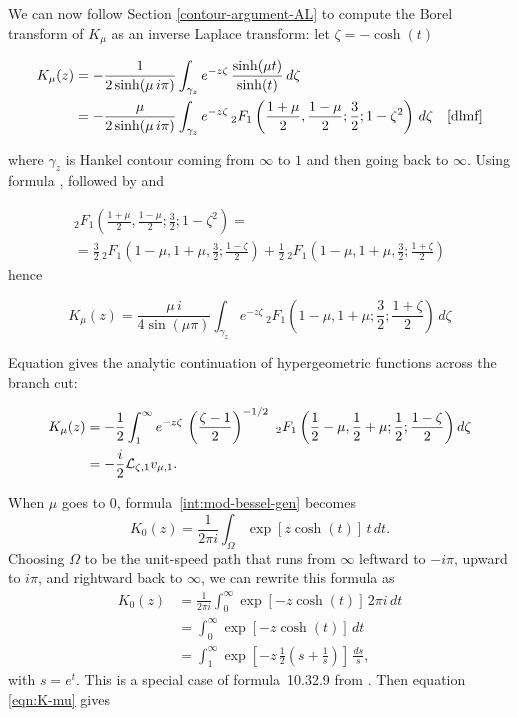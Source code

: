\documentclass{article}
\theoremstyle{definition}
\newcommand{\laplace}{\mathcal{L}}
\begin{document}
We can now follow Section \ref{contour-argument-AL} to compute the Borel transform of $K_\mu$ as an inverse Laplace transform: let $\zeta=-\cosh(t)$

\begin{align*}
    K_\mu(z)& = -\frac{1}{2 \sinh(\mu\,i\pi)} \int_{\gamma_z} e^{-z \zeta}\,\frac{\sinh(\mu t)}{\sinh(t)}\,d\zeta  & \\
    &=-\frac{\mu}{2 \sinh(\mu\,i\pi)} \int_{\gamma_z} e^{-z \zeta}\, {}_2F_1\left(\frac{1+\mu}{2},\frac{1-\mu}{2};\frac{3}{2};1-\zeta^2\right)\,d\zeta & \cite[15.4.16]{dlmf}
\end{align*}

where $\gamma_z$ is Hankel contour coming from $\infty$ to $1$ and then going back to $\infty$. Using formula \cite[15.8.4]{dlmf}, followed by \cite[15.8.27]{dlmf} and \cite[15.8.28]{dlmf}

\begin{multline*}
     {}_2F_1\left(\frac{1+\mu}{2},\frac{1-\mu}{2};\frac{3}{2};1-\zeta^2\right) = \\
     =\frac{3}{2}\, {}_2F_1\left(1-\mu,1+\mu,\frac{3}{2};\frac{1-\zeta}{2}\right)+\frac{1}{2}\, {}_2F_1\left(1-\mu,1+\mu,\frac{3}{2};\frac{1+\zeta}{2}\right)
\end{multline*}
hence 

\[K_\mu(z)=\frac{\mu\, i}{4 \sin(\mu\pi)} \int_{\gamma_z} e^{-z \zeta}\, {}_2F_1\left(1-\mu,1+\mu;\frac{3}{2};\frac{1+\zeta}{2}\right)\,d\zeta\]

Equation \cite[15.2.3]{dlmf} gives the analytic continuation of hypergeometric functions across the branch cut:

\begin{align}
    K_{\mu}(z)& \label{eqn:K-mu}=-\frac{1}{2}\int_1^\infty e^{-z\zeta} \, \left(\frac{\zeta-1}{2}\right)^{-1/2} \,\, {}_2F_1\left(\frac{1}{2}-\mu, \frac{1}{2}+\mu;\frac{1}{2};\frac{1-\zeta}{2}\right)  d\zeta\\
    &  \notag=-\frac{i}{2}\laplace_{\zeta,1} v_{\mu,1} . 
\end{align}

When $\mu$ goes to $0$, formula~\eqref{int:mod-bessel-gen} becomes
\[ K_0(z) = \frac{1}{2\pi i} \int_\Omega \exp\left[z \cosh(t)\right]\,t\,dt. \]
Choosing $\Omega$ to be the unit-speed path that runs from $\infty$ leftward to $-i\pi$, upward to $i\pi$, and rightward back to $\infty$, we can rewrite this formula as
\begin{align*}
K_0(z) & = \frac{1}{2\pi i} \int_0^\infty \exp\left[-z \cosh(t)\right]\,2\pi i\,dt \\
& = \int_0^\infty \exp\left[-z \cosh(t)\right]\,dt \\
& = \int_1^\infty \exp\left[-z\,\tfrac{1}{2}\left(s + \tfrac{1}{s}\right)\right]\,\frac{ds}{s},
\end{align*}
with $s = e^t$. This is a special case of formula~10.32.9 from \cite{dlmf}. Then equation \eqref{eqn:K-mu} gives
\end{document}
